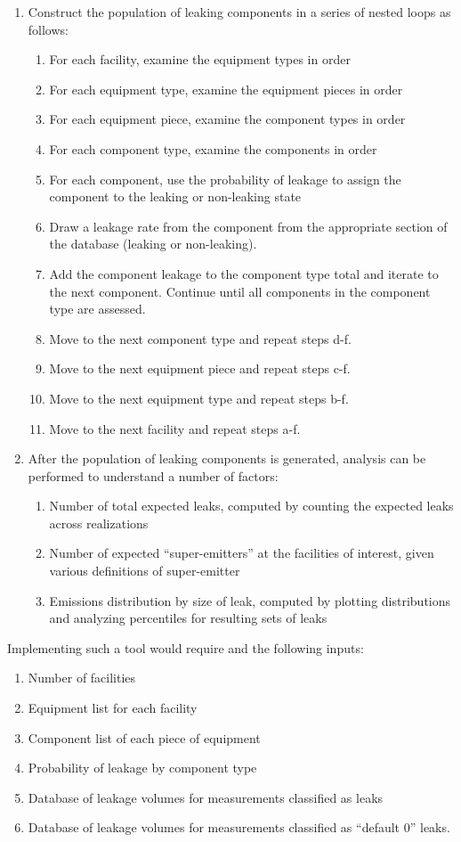\documentclass[11pt]{report}
\begin{document}
{{{{\begin{enumerate}
\item Construct the population of leaking components in a series of nested loops as follows:
	\begin{enumerate}
	\item For each facility, examine the equipment types in order
	\item For each equipment type, examine the equipment pieces in order
	\item For each equipment piece, examine the component types in order
	\item For each component type, examine the components in order
	\item For each component, use the probability of leakage to assign the component to the leaking or non-leaking state
	\item Draw a leakage rate from the component from the appropriate section of the database (leaking or non-leaking). 
	\item Add the component leakage to the component type total and iterate to the next component. Continue until all components in 	the component type are assessed.
	\item Move to the next component type and repeat steps d-f.
	\item Move to the next equipment piece and repeat steps c-f.
	\item Move to the next equipment type and repeat steps b-f.
	\item Move to the next facility and repeat steps a-f.
	\end{enumerate}
\item After the population of leaking components is generated, analysis can be performed to understand a number of factors:
	\begin{enumerate}
	\item Number of total expected leaks, computed by counting the expected leaks across realizations
	\item Number of expected ``super-emitters'' at the facilities of interest, given various definitions of super-emitter
	\item Emissions distribution by size of leak, computed by plotting distributions and analyzing percentiles for resulting sets of leaks
	\end{enumerate}
\end{enumerate}

Implementing such a tool would require and the following inputs: 
\begin{enumerate}
\item	Number of facilities
\item	Equipment list for each facility
\item Component list of each piece of equipment
\item Probability of leakage by component type
\item Database of leakage volumes for measurements classified as leaks
\item Database of leakage volumes for measurements classified as ``default 0'' leaks.
\end{enumerate}

}}}}
\end{document}
